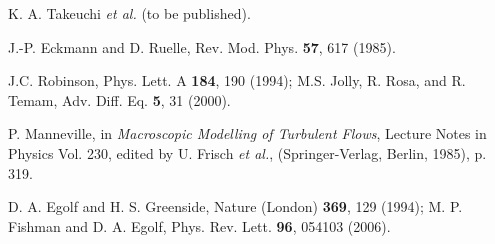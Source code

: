\documentclass[prl,twocolumn,twoside,showpacs,superscriptaddress]{revtex4}
\begin{document}
\begin{thebibliography}{99}
 K. A. Takeuchi {\it et al.} (to be published).

J.-P. Eckmann and D. Ruelle, Rev. Mod. Phys. {\bf 57}, 617 (1985).

J.C. Robinson, Phys. Lett. A {\bf 184}, 190 (1994);
 M.S. Jolly, R. Rosa, and R. Temam, Adv. Diff. Eq. {\bf 5}, 31 (2000).

 P. Manneville, in \textit{Macroscopic Modelling of Turbulent Flows}, 
Lecture Notes in Physics Vol. 230, 
edited by U. Frisch {\it et al.}, (Springer-Verlag, Berlin, 1985), p. 319.

 D. A. Egolf and H. S. Greenside, Nature (London) \textbf{369}, 129 (1994);
 M. P. Fishman and D. A. Egolf, Phys. Rev. Lett. \textbf{96}, 054103 (2006).




\end{thebibliography}
\end{document}
